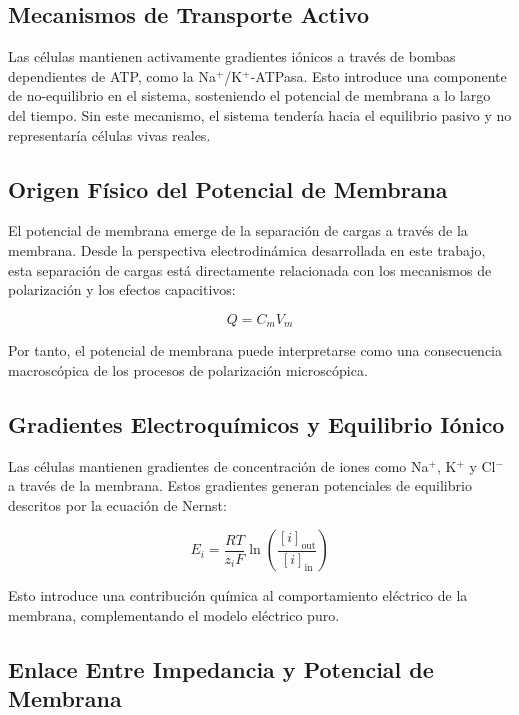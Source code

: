 \documentclass[12pt]{article}
\begin{document}
\subsection{Mecanismos de Transporte Activo}

Las c\'elulas mantienen activamente gradientes i\'onicos a trav\'es de bombas dependientes de
ATP, como la Na$^+$/K$^+$-ATPasa. Esto introduce una componente de no-equilibrio en el
sistema,
sosteniendo el potencial de membrana a lo largo del tiempo. Sin este mecanismo, el sistema
tender\'ia hacia el equilibrio pasivo y no representar\'ia c\'elulas vivas reales.

\subsection{Origen F\'isico del Potencial de Membrana}

El potencial de membrana emerge de la separaci\'on de cargas a trav\'es de la membrana. Desde
la perspectiva electrodin\'amica desarrollada en este trabajo, esta separaci\'on de cargas est\'a
directamente relacionada con los mecanismos de polarizaci\'on y los efectos capacitivos:

\begin{equation}
Q = C_m V_m
\end{equation}

Por tanto, el potencial de membrana puede interpretarse como una consecuencia macrosc\'opica
de los procesos de polarizaci\'on microsc\'opica.

\subsection{Gradientes Electroqu\'imicos y Equilibrio I\'onico}

Las c\'elulas mantienen gradientes de concentraci\'on de iones como Na$^+$, K$^+$ y Cl$^-$ a
trav\'es de la membrana. Estos gradientes generan potenciales de equilibrio descritos por la
ecuaci\'on de Nernst:

\begin{equation}
E_i = \frac{RT}{z_i F}
\ln\left(
\frac{[i]_{\text{out}}}{[i]_{\text{in}}}
\right)
\end{equation}

Esto introduce una contribuci\'on qu\'imica al comportamiento el\'ectrico de la membrana,
complementando el modelo el\'ectrico puro.

\subsection{Enlace Entre Impedancia y Potencial de Membrana}
\end{document}
